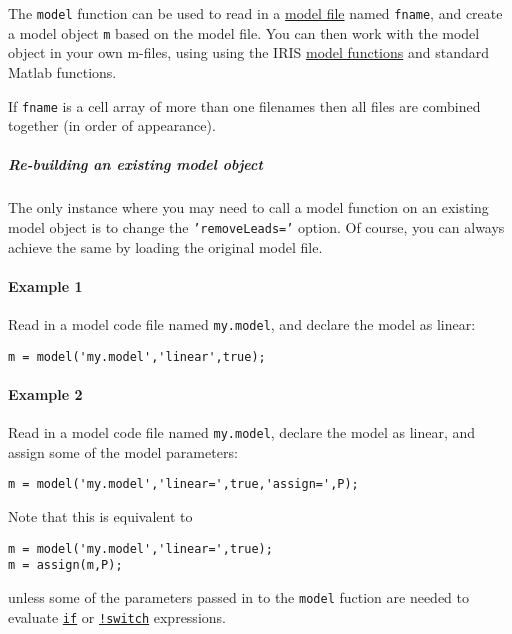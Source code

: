 The \texttt{model} function can be used to read in a
\href{modellang/Contents}{model file} named \texttt{fname}, and create a
model object \texttt{m} based on the model file. You can then work with
the model object in your own m-files, using using the IRIS
\href{model/Contents}{model functions} and standard Matlab functions.

If \texttt{fname} is a cell array of more than one filenames then all
files are combined together (in order of appearance).

\subparagraph{Re-building an existing model
object}\label{re-building-an-existing-model-object}

The only instance where you may need to call a model function on an
existing model object is to change the \texttt{'removeLeads='} option.
Of course, you can always achieve the same by loading the original model
file.

\paragraph{Example 1}\label{example-1}

Read in a model code file named \texttt{my.model}, and declare the model
as linear:

\begin{verbatim}
m = model('my.model','linear',true);
\end{verbatim}

\paragraph{Example 2}\label{example-2}

Read in a model code file named \texttt{my.model}, declare the model as
linear, and assign some of the model parameters:

\begin{verbatim}
m = model('my.model','linear=',true,'assign=',P);
\end{verbatim}

Note that this is equivalent to

\begin{verbatim}
m = model('my.model','linear=',true);
m = assign(m,P);
\end{verbatim}

unless some of the parameters passed in to the \texttt{model} fuction
are needed to evaluate \href{modellang/if}{\texttt{if}} or
\href{modellang/switch}{\texttt{!switch}} expressions.


